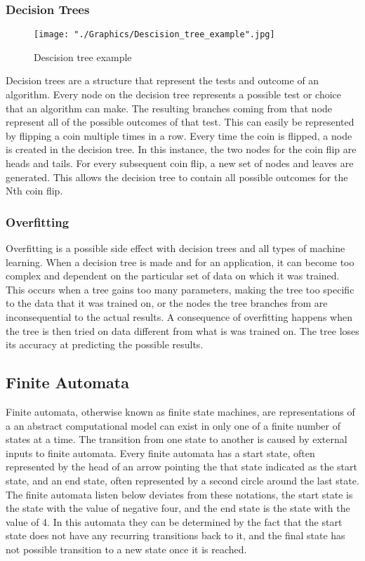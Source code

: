 \documentclass{sig-alternate}
\begin{document}
\subsubsection{Decision Trees}
\label{sec:decision_trees}
\begin{figure}[!]
	\texttt{[image: "./Graphics/Descision\_tree\_example".jpg]}
	\caption{Descision tree example}
	\label{fig:descisiontree}
\end{figure}
	Decision trees are a structure that represent the tests and outcome of an algorithm. Every node on the decision tree represents a possible test or choice that an algorithm can make. The resulting branches coming from that node represent all of the possible outcomes of that test. This can easily be represented by flipping a coin multiple times in a row. Every time the coin is flipped, a node is created in the decision tree. In this instance, the two nodes for the coin flip are heads and tails. For every subsequent coin flip, a new set of nodes and leaves are generated. This allows the decision tree to contain all possible outcomes for the Nth coin flip.

\subsubsection{Overfitting}
\label{sec:overfitting}
	Overfitting is a possible side effect with decision trees and all types of machine learning. When a decision tree is made and for an application, it can become too complex and dependent on the particular set of data on which it was trained. This occurs when a tree gains too many parameters, making the tree too specific to the data that it was trained on, or the nodes the tree branches from are inconsequential to the actual results. A consequence of overfitting happens when the tree is then tried on data different from what is was trained on. The tree loses its accuracy at predicting the possible results.
\subsection{Finite Automata}
\label{sec:finiteautomata}
	Finite automata, otherwise known as finite state machines, are representations of a an abstract computational model can exist in only one of a finite number of states at a time. The transition from one state to another is caused by external inputs to finite automata. Every finite automata has a start state, often represented by the head of an arrow pointing the that state indicated as the start state, and an end state, often represented by a second circle around the last state. The finite automata listen below deviates from these notations, the start state is the state with the value of negative four, and the end state is the state with the value of 4. In this automata they can be determined by the fact that the start state does not have any recurring transitions back to it, and the final state has not possible transition to a new state once it is reached.
\end{document}
